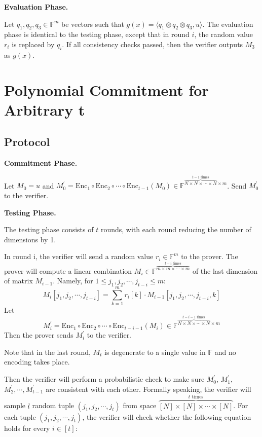 \textbf{Evaluation Phase.}

Let $q_1, q_2, q_3 \in \mathbb{F}^{m}$ be vectors such that $g(x) =\langle q_1 \otimes q_2 \otimes q_3, u \rangle $. The evaluation phase is identical to the testing phase, except that in round $i$, the random value $r_i$ is replaced by $q_i$. If all consistency checks passed, then the verifier outputs $M_{3}$ as $g(x)$.

\section{Polynomial Commitment for Arbitrary t}

\subsection{Protocol}

\textbf{Commitment Phase.}

Let $M_0 = u$ and $ M_0^{\prime} = \text{Enc}_1 \circ \text{Enc}_2 \circ \cdots \circ \text{Enc}_{t-1} (M_0) \in \mathbb{F}^{\overbrace{N \times N \times \cdots \times N}^{t-1 \text{ times}} \times m}$. Send $M_0^{\prime}$ to the verifier.

\textbf{Testing Phase.}

The testing phase consists of $t$ rounds, with each round reducing the number of dimensions by 1.

In round i, the verifier will send a random value $r_i \in \mathbb{F}^m$ to the prover.
The prover will compute a linear combination $M_i \in \mathbb{F}^{\overbrace{m \times m \times \cdots \times m}^{t-i \text{ times}}}$ of the last dimension of matrix $M_{i-1}$.
Namely, for $1 \le j_1,j_2, \cdots, j_{t-i} \le m$:
$$M_i[j_1,j_2, \cdots, j_{t-i}] = \sum_{k=1}^{m} r_{i}[k] \cdot M_{i-1}[j_1,j_2, \cdots, j_{t-i}, k]$$
Let 
$$
M_i^\prime = \text{Enc}_1 \circ \text{Enc}_2 \circ \cdots \circ \text{Enc}_{t - i - 1}(M_i)\in \mathbb{F}^{\overbrace{N \times N \times \cdots \times N}^{t-i-1 \text{ times}} \times m}
$$
Then the prover sends $M_i^\prime$ to the verifier.

Note that in the last round, $M_t$ is degenerate to a single value in $\mathbb{F}$ and no encoding takes place.

Then the verifier will perform a probabilistic check to make sure 
$M_0^\prime$, $M_1^\prime$, $M_2^\prime, \cdots, M_{t-1}^\prime$ 
are consistent with each other. Formally speaking, the verifier will sample $l$ random tuple $(j_1, j_2, \cdots, j_t)$ from space $\overbrace{[N] \times [N] \times \cdots \times [N]}^{t \text{ times}}$. 
For each tuple $(j_1, j_2, \cdots, j_t)$,
the verifier will check whether the following equation holds for every $i \in [t]$:

